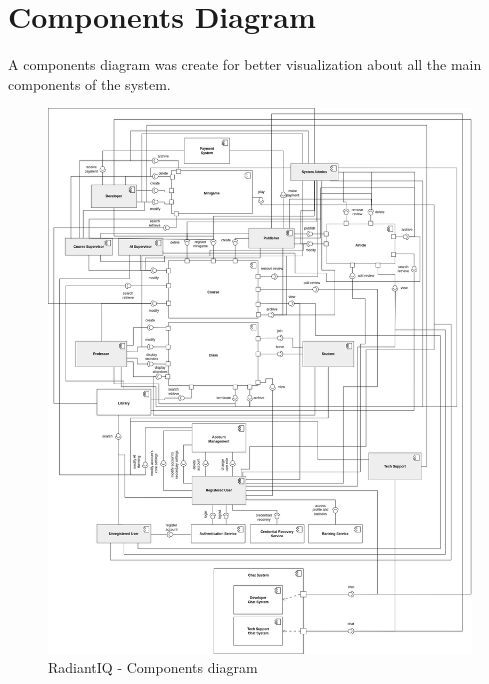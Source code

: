 \section{Components Diagram} \label{components-diagram}

A components diagram was create for better visualization about all the main components of the system.

\begin{figure}[H]
	\centering
	\includegraphics[width=1.0\linewidth]{images/components-diagram.png}
	\caption{RadiantIQ - Components diagram}
	\label{fig:components-diagram}
\end{figure}